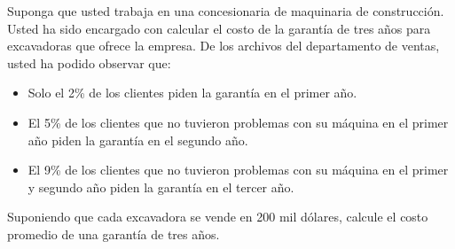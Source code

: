 \documentclass[ a4paper, twoside, 11pt]{article}
\begin{document}
\begin{problem}
Suponga que usted trabaja en una concesionaria de maquinaria de construcci\'on. Usted ha sido encargado con calcular el costo de la garant\'ia de tres a\~nos para excavadoras que ofrece la empresa. De los archivos del departamento de ventas, usted ha podido observar que: 
\begin{itemize}
\item Solo el 2\% de los clientes piden la garant\'ia en el primer a\~no. 
\item El 5\% de los clientes que no tuvieron problemas con su m\'aquina en el primer a\~no piden la garant\'ia en el segundo a\~no. 
\item El 9\% de los clientes que no tuvieron problemas con su m\'aquina en el primer y segundo a\~no piden la garant\'ia en el tercer a\~no. 
\end{itemize}
Suponiendo que cada excavadora se vende en 200 mil d\'olares, calcule el costo promedio de una garant\'ia de tres a\~nos. 

\end{problem}
\vspace{\baselineskip}
\end{document}
